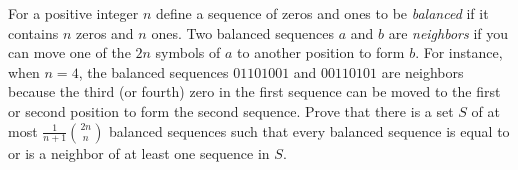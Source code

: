 For a positive integer $n$ define a sequence of zeros and ones to be \emph{balanced} if it contains $n$ zeros and $n$ ones. Two balanced sequences $a$ and $b$ are \emph{neighbors} if you can move one of the $2n$ symbols of $a$ to another position to form $b$. For instance, when $n = 4$, the balanced sequences $01101001$ and $00110101$ are neighbors because the third (or fourth) zero in the first sequence can be moved to the first or second position to form the second sequence. Prove that there is a set $S$ of at most $\frac{1}{n+1}\binom{2n}{n}$ balanced sequences such that every balanced sequence is equal to or is a neighbor of at least one sequence in $S$.
